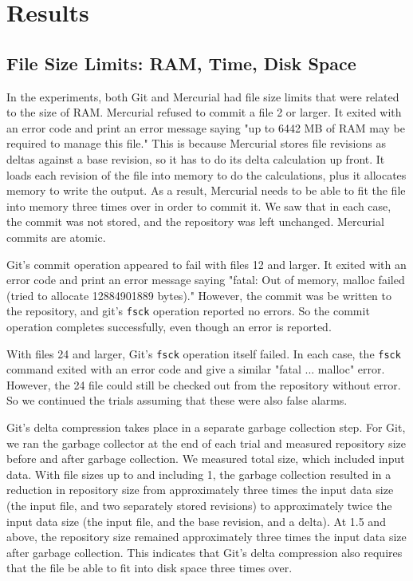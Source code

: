 \section{Results}

\subsection{File Size Limits: RAM, Time, Disk Space}

In the experiments, both Git and Mercurial had file size limits that were related to the size of RAM.
Mercurial refused to commit a file \SI{2}{\gib} or larger.
It exited with an error code and print an error message saying "up to 6442 MB of RAM may be required to manage this file."
This is because Mercurial stores file revisions as deltas against a base revision, so it has to do its delta calculation up front.
It loads each revision of the file into memory to do the calculations, plus it allocates memory to write the output.
As a result, Mercurial needs to be able to fit the file into memory three times over in order to commit it.
We saw that in each case, the commit was not stored, and the repository was left unchanged.
Mercurial commits are atomic.

Git's commit operation appeared to fail with files \SI{12}{\gib} and larger.
It exited with an error code and print an error message saying "fatal: Out of memory, malloc failed (tried to allocate \num{12884901889} bytes)."
However, the commit was be written to the repository, and git's \lstinline{fsck} operation reported no errors.
So the commit operation completes successfully, even though an error is reported.

With files \SI{24}{\gib} and larger, Git's \lstinline{fsck} operation itself failed.
In each case, the \lstinline{fsck} command exited with an error code and give a similar "fatal ... malloc" error.
However, the \SI{24}{\gib} file could still be checked out from the repository without error.
So we continued the trials assuming that these were also false alarms.

Git's delta compression takes place in a separate garbage collection step.
For Git, we ran the garbage collector at the end of each trial and measured repository size before and after garbage collection.
We measured total size, which included input data.
With file sizes up to and including \SI{1}{\gib}, the garbage collection resulted in a reduction in repository size from approximately three times the input data size (the input file, and two separately stored revisions) to approximately twice the input data size (the input file, and the base revision, and a delta).
At \SI{1.5}{\gib} and above, the repository size remained approximately three times the input data size after garbage collection.
This indicates that Git's delta compression also requires that the file be able to fit into disk space three times over.

